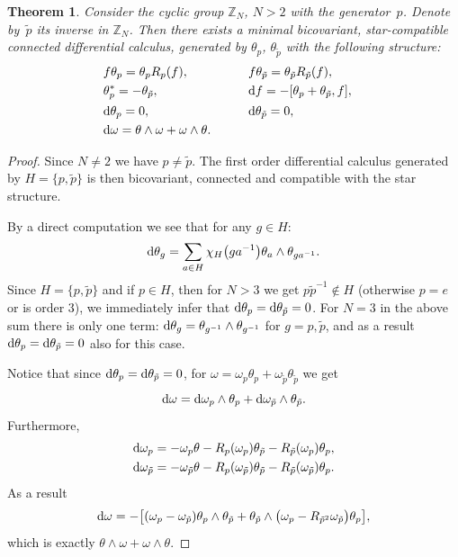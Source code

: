 \documentclass[pdftex]{sigma}
\numberwithin{equation}{section}
\newtheorem{Theorem}{Theorem}[section]
\newcommand{\Z}{\mathbb{Z}}
\newcommand{\ip}{{\tilde{p}}}
\begin{document}
\begin{Theorem} \label{dcZN}
Consider the cyclic group $\Z_N$, $N>2$ with the generator~$p$. Denote by~$\tilde{p}$ its inverse in $\Z_N$.
Then there exists a minimal bicovariant, star-compatible connected differential calculus, generated by
$\theta_p$, $\theta_\ip$ with the following structure:
\begin{alignat*}{3}
& f \theta_p = \theta_p R_p(f), \qquad && f \theta_\ip = \theta_\ip R_\ip(f), &\nonumber\\
& \theta_p^* = - \theta_\ip, \qquad && {\rm d} f = - [ \theta_p + \theta_\ip, f ], &\nonumber\\
& {\rm d} \theta_p = 0, \qquad && {\rm d} \theta_\ip = 0,& \nonumber\\
& {\rm d} \omega = \theta \wedge \omega + \omega \wedge \theta.\qquad & && %
\end{alignat*}
\end{Theorem}
\begin{proof}Since $N\neq 2$ we have $p\neq \ip$. The first order differential calculus generated by $H=\{p,\ip\}$ is then bicovariant,
connected and compatible with the star structure.

By a direct computation we see that for any $g\in H$:
\[ {\rm d}\theta_g=\sum\limits_{a\in H}\chi_H\big(ga^{-1}\big)\theta_a\wedge \theta_{ga^{-1}}.\]
Since $H=\{p,\ip\}$ and if $p\in H$, then for $N>3$ we get $p\ip^{-1}\not\in H$ (otherwise $p=e$ or is order $3$), we immediately infer that ${\rm d}\theta_p={\rm d}\theta_{\ip}=0$. For $N=3$ in the above sum there is only one term: ${\rm d}\theta_g=\theta_{g^{-1}}\wedge \theta_{g^{-1}}$ for $g=p,\ip$, and as a result ${\rm d}\theta_p={\rm d}\theta_\ip=0$ also for this case.

Notice that since ${\rm d}\theta_p={\rm d}\theta_{\ip}=0$, for $\omega=\omega_p\theta_p+\omega_{\ip}\theta_{\ip}$ we get
\[ {\rm d}\omega={\rm d}\omega_p\wedge\theta_p+{\rm d}\omega_{\ip}\wedge\theta_{\ip}.\]
Furthermore,
\begin{gather*}
 {\rm d}\omega_p=-\omega_p\theta-R_{p}(\omega_p)\theta_{\ip}-R_{\ip}(\omega_p)\theta_p,\\
 {\rm d}\omega_\ip=-\omega_\ip\theta-R_{p}(\omega_\ip)\theta_{\ip}-R_{\ip}(\omega_\ip)\theta_p.
\end{gather*}
As a result
\[ {\rm d}\omega =-\big[(\omega_p-\omega_{\ip})\theta_p\wedge\theta_\ip+\theta_\ip\wedge\big(\omega_p-R_{\ip^2}\omega_\ip\big)\theta_p\big],\]
which is exactly $ \theta \wedge \omega + \omega \wedge \theta$.
\end{proof}
\end{document}

